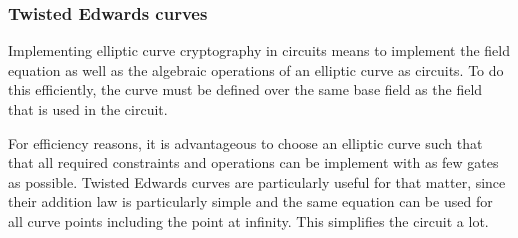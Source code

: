 \subsubsection{Twisted Edwards curves} Implementing elliptic curve cryptography in circuits means to implement the field equation as well as the algebraic operations  of an elliptic curve as circuits. To do this efficiently, the curve must be defined over the same base field as the field that is used in the circuit. 

For efficiency reasons, it is advantageous to choose an elliptic curve such that that all required constraints and operations can be implement with as few gates as possible. Twisted Edwards curves are particularly useful for that matter, since their addition law is particularly simple and the same equation can be used for all curve points including the point at infinity. This simplifies the circuit a lot.
